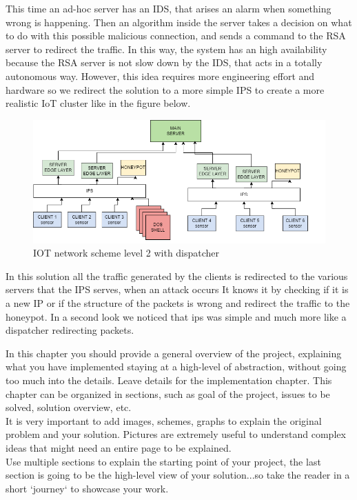 This time an ad-hoc server has an IDS, that arises an alarm when something wrong is happening. Then an algorithm inside the server takes a decision on what to do with this possible malicious connection, and sends a command to the RSA server to redirect the traffic. In this way, the system has an high availability because the RSA server is not slow down by the IDS, that acts in a totally autonomous way. However, this idea requires more engineering effort and hardware so we redirect the solution to a more simple IPS to create a more realistic IoT cluster like in the figure below. 
\begin{figure}[h!]
  \centering
  \includegraphics[width = 15cm]{images/IOTlevel2IPS.drawio.png}
  \caption{IOT network scheme level 2 with dispatcher}
  \label{fig:3period}
\end{figure}
\FloatBarrier
 In this solution all the traffic generated by the clients is redirected to the various servers that the IPS serves, when an attack occurs It knows it by checking if it is a new IP or if the structure of the packets is wrong and redirect the traffic to the honeypot. 
In a second look we noticed that ips was simple and much more like a dispatcher redirecting packets.






In this chapter you should provide a general overview of the project, explaining what you have implemented staying at a high-level of abstraction, without going too much into the details. Leave details for the implementation chapter. This chapter can be organized in sections, such as goal of the project, issues to be solved, solution overview, etc.\\It is very important to add images, schemes, graphs to explain the original problem and your solution. Pictures are extremely useful to understand complex ideas that might need an entire page to be explained.\\Use multiple sections to explain the starting point of your project, the last section is going to be the high-level view of your solution...so take the reader in a short `journey` to showcase your work.





